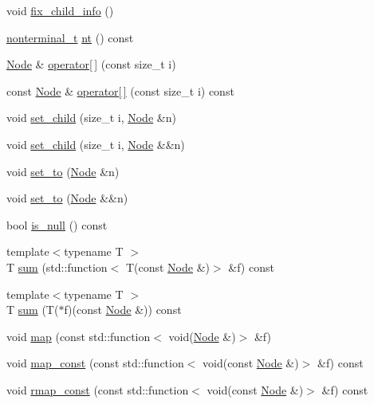 \begin{DoxyCompactItemize}
void \hyperlink{class_node_a8f25f44608c0b19fe02eaf19ade9ea68}{fix\+\_\+child\+\_\+info} ()
\item 
\hyperlink{_nonterminal_8h_a5c1f658dc7560600a16d22408bd716ca}{nonterminal\+\_\+t} \hyperlink{class_node_a4abe3acdc804489a01ef13a25b130fd8}{nt} () const
\item 
\hyperlink{class_node}{Node} \& \hyperlink{class_node_a0b89084e2c7416379edb7c537edcc8f2}{operator\mbox{[}$\,$\mbox{]}} (const size\+\_\+t i)
\item 
const \hyperlink{class_node}{Node} \& \hyperlink{class_node_a8bdfdaa5eb291ae5fb417f45fb8a3633}{operator\mbox{[}$\,$\mbox{]}} (const size\+\_\+t i) const
\item 
void \hyperlink{class_node_afff50c3712b8e30fffd479cad4eee023}{set\+\_\+child} (size\+\_\+t i, \hyperlink{class_node}{Node} \&n)
\item 
void \hyperlink{class_node_a486882370d2c9592c6eabb52a3289253}{set\+\_\+child} (size\+\_\+t i, \hyperlink{class_node}{Node} \&\&n)
\item 
void \hyperlink{class_node_a1a6f6c8062e66046c302a80cc7e8d817}{set\+\_\+to} (\hyperlink{class_node}{Node} \&n)
\item 
void \hyperlink{class_node_a10c63ea2ec819dc5b195c4df33cde113}{set\+\_\+to} (\hyperlink{class_node}{Node} \&\&n)
\item 
bool \hyperlink{class_node_a895ef3b66f975fbaec1e5866a57afbed}{is\+\_\+null} () const
\item 
{\footnotesize template$<$typename T $>$ }\\T \hyperlink{class_node_ac91282056a0df2835f1579bdd21c93e1}{sum} (std\+::function$<$ T(const \hyperlink{class_node}{Node} \&)$>$ \&f) const
\item 
{\footnotesize template$<$typename T $>$ }\\T \hyperlink{class_node_a089e99addd93f91b2ef5a9d0c3e6bdeb}{sum} (T($\ast$f)(const \hyperlink{class_node}{Node} \&)) const
\item 
void \hyperlink{class_node_adefac3cb7b411321c5af15dad1484834}{map} (const std\+::function$<$ void(\hyperlink{class_node}{Node} \&)$>$ \&f)
\item 
void \hyperlink{class_node_a4337bb93da78e142c6171fd81acab93c}{map\+\_\+const} (const std\+::function$<$ void(const \hyperlink{class_node}{Node} \&)$>$ \&f) const
\item 
void \hyperlink{class_node_a59da25cea338385d73b898b86492f97e}{rmap\+\_\+const} (const std\+::function$<$ void(const \hyperlink{class_node}{Node} \&)$>$ \&f) const

\end{DoxyCompactItemize}
